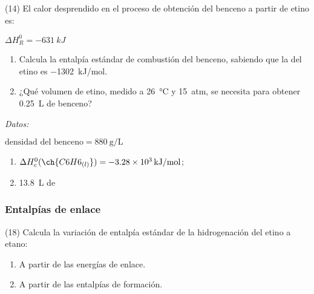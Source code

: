 \documentclass[10pt]{article}
\newenvironment{gexdatos}{
      \vspace{2pt}\noindent\textit{Datos: }
    }{\vspace{5pt}}
\begin{document}
\begin{multicols}{2}
\begin{exercise}[
    tags    = {},
    topics  = {química, termodinámica, termoquímica},
    source  = {FQ 1B MGH 2016, p180, e14},
  ]
  (14) El calor desprendido en el proceso de obtención del benceno a partir de etino es:

   \( \Delta H^0_R = \SI{-631}{kJ} \)

  \begin{enumerate}
    \item Calcula la entalpía estándar de combustión del benceno, sabiendo que la del etino es \SI{-1302}{kJ/mol}.
    \item ¿Qué volumen de etino, medido a \SI{26}{\celsius} y \SI{15}{atm}, se necesita para obtener \SI{0.25}{\liter} de benceno?
  \end{enumerate}

  \begin{gexdatos}
    \( \textrm{densidad del benceno} = \SI{880}{\gram\per\liter} \)
  \end{gexdatos}
\end{exercise}

\begin{solution}
  \begin{enumerate}
    \item \( \Delta H^0_c (\ch{C6H6_{(l)}}) = \SI{-3.28e3}{kJ/mol} \); \item \SI{13.8}{\liter} de 
  \end{enumerate}
\end{solution}






\subsubsection{Entalpías de enlace}

\begin{exercise}[
    tags    = {},
    topics  = {química, termodinámica, termoquímica},
    source  = {FQ 1B MGH 2016, p180, e18},
  ]
  (18) Calcula la variación de entalpía estándar de la hidrogenación del etino a etano:

  \begin{enumerate}
    \item A partir de las energías de enlace.
    \item A partir de las entalpías de formación.
  \end{enumerate}


\end{exercise}
\end{multicols}
\end{document}
